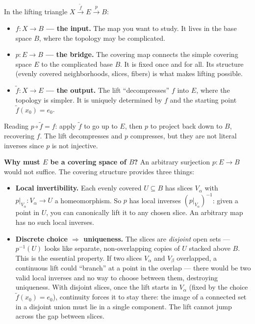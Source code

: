 \documentclass[11pt]{report}
\begin{document}
\begin{rembox}
In the lifting triangle $X \xrightarrow{\tilde{f}} E \xrightarrow{p} B$:
\begin{itemize}[nosep]
    \item \textbf{$f: X \to B$ --- the input.} The map you want to study. It lives in the base space $B$, where the topology may be complicated.
    \item \textbf{$p: E \to B$ --- the bridge.} The covering map connects the simple covering space $E$ to the complicated base $B$. It is fixed once and for all. Its structure (evenly covered neighborhoods, slices, fibers) is what makes lifting possible.
    \item \textbf{$\tilde{f}: X \to E$ --- the output.} The lift ``decompresses'' $f$ into $E$, where the topology is simpler. It is uniquely determined by $f$ and the starting point $\tilde{f}(x_0) = e_0$.
\end{itemize}
Reading $p \circ \tilde{f} = f$: apply $\tilde{f}$ to go up to $E$, then $p$ to project back down to $B$, recovering $f$. The lift decompresses and $p$ compresses, but they are not literal inverses since $p$ is not injective.

\textbf{Why must $E$ be a covering space of $B$?} An arbitrary surjection $p: E \to B$ would not suffice. The covering structure provides three things:
\begin{itemize}[nosep]
    \item \textbf{Local invertibility.} Each evenly covered $U \subseteq B$ has slices $V_\alpha$ with $p|_{V_\alpha}: V_\alpha \to U$ a homeomorphism. So $p$ has local inverses $(p|_{V_\alpha})^{-1}$: given a point in $U$, you can canonically lift it to any chosen slice. An arbitrary map has no such local inverses.
    \item \textbf{Discrete choice $\Rightarrow$ uniqueness.} The slices are \emph{disjoint} open sets --- $p^{-1}(U)$ looks like separate, non-overlapping copies of $U$ stacked above $B$. This is the essential property. If two slices $V_\alpha$ and $V_\beta$ overlapped, a continuous lift could ``branch'' at a point in the overlap --- there would be two valid local inverses and no way to choose between them, destroying uniqueness. With disjoint slices, once the lift starts in $V_\alpha$ (fixed by the choice $\tilde{f}(x_0) = e_0$), continuity forces it to stay there: the image of a connected set in a disjoint union must lie in a single component. The lift cannot jump across the gap between slices.
    

\end{itemize}
\end{rembox}
\end{document}
